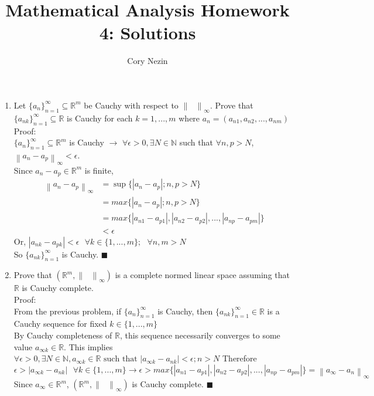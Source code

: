 \documentclass[12pt]{article}
\title{Mathematical Analysis Homework 4: Solutions}
\author{Cory Nezin}
\newcommand{\norm}[1]{\left \lVert#1\right\rVert_\infty}
\begin{document}
\maketitle
\begin{enumerate}
\item Let $\{a_n\}_{n=1}^\infty \subseteq \mathbb{R}^m$ be Cauchy with respect to $\norm{\text{ }}$.  Prove that $\{a_{nk}\}_{n=1}^\infty \subseteq \mathbb{R}$ is Cauchy for each $k = 1,...,m $ where $ a_n = (a_{n1},a_{n2},...,a_{nm})$\\
Proof:\\
$\{a_n\}_{n=1}^\infty \subseteq \mathbb{R}^m$ is Cauchy $\rightarrow$ $\forall \epsilon > 0, \exists N\in \mathbb{N}$ such that $\forall n,p > N$, $\norm{a_n-a_p} < \epsilon$.\\
Since $a_n-a_p\in \mathbb{R}^m$ is finite,
\begin{align*}
  \norm{a_n-a_p} &= \sup\{|a_n-a_p|;n,p>N\} \\
  &= max\{|a_n-a_p|;n,p>N\} \\
  &= max\{|a_{n1}-a_{p1}|,|a_{n2}-a_{p2}|,...,|a_{np}-a_{pm}|\}\\
  &< \epsilon
\end{align*}
Or, $|a_{nk} - a_{pk}| < \epsilon \text{ } \forall k \in \{1,...,m\};\text{ }\forall n,m > N$\\
So $\{a_{nk}\}_{n=1}^\infty$ is Cauchy. $\blacksquare$
\item
Prove that $(\mathbb{R}^m,\norm{\text{ }})$ is a complete normed linear space assuming that $\mathbb{R}$ is Cauchy complete.\\
Proof:\\
From the previous problem, if $\{a_n\}_{n=1}^\infty$ is Cauchy, then $\{a_{nk}\}_{n=1}^\infty\in\mathbb{R}$ is a Cauchy sequence for fixed $k\in\{1,...,m\}$\\
By Cauchy completeness of $\mathbb{R}$, this sequence necessarily converges to some value $a_{\infty k} \in \mathbb{R}$.  This implies $\forall \epsilon >0, \exists N\in\mathbb{N},a_{\infty k}\in\mathbb{R} \text{ such that } |a_{\infty k}-a_{nk}| < \epsilon; n>N$
Therefore $\epsilon > |a_{\infty k}-a_{nk}| \text{ } \forall k \in \{1,...,m\} \rightarrow \epsilon > max\{|a_{n1}-a_{p1}|,|a_{n2}-a_{p2}|,...,|a_{np}-a_{pm}|\} = \norm{a_\infty-a_n}$\\
Since $a_\infty \in \mathbb{R}^m$, $(\mathbb{R}^m,\norm{\text{ }})$ is Cauchy complete. $\blacksquare$\\
\end{enumerate}
\end{document}
